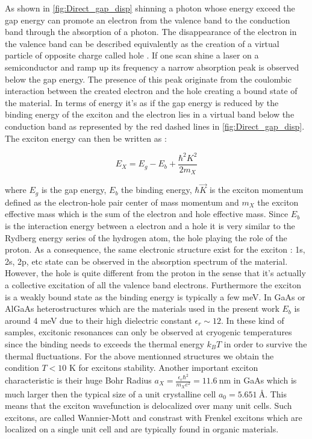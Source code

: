 \label{sub:exciton}

As shown in \autoref{fig:Direct_gap_disp} shinning a photon whose energy exceed the gap energy can promote an electron from the valence band to the conduction band through the absorption of a photon. 
The disappearance of the electron in the valence band can be described equivalently as the creation of a virtual particle of opposite charge called hole \cite{Combescot_cooper_excitons_2015}.
 If one scan shine a laser on a semiconductor and ramp up its frequency a narrow absorption peak is observed below the gap energy.  The presence of this peak originate from the coulombic interaction between the created electron and the hole creating a bound state of the material. In terms of energy it's as if the gap energy is reduced by the binding energy of the exciton and the electron lies in a virtual band below the conduction band as represented by the red dashed lines in \autoref{fig:Direct_gap_disp}.
 The exciton energy can then be written as : 

\begin{equation}
    E_{X} = E_g - E_b + \frac{\hbar^2 K^2}{2m_{X}}
\end{equation}

where $E_g$ is the gap energy, $E_b$ the binding energy,  $\hbar \vec{K}$ is the exciton momentum defined as the electron-hole pair center of mass momentum and $m_{X}$ the exciton effective mass which is the sum of the electron and hole effective mass.
Since $E_b$ is the interaction energy between a electron and a hole it is very similar to the Rydberg energy series of the hydrogen atom, the hole playing the role of the proton. As a consequence, the same electronic structure exist for the exciton : 1s, 2s, 2p, etc state can be observed in the absorption spectrum of the material.
However, the hole is quite different from the proton in the sense that it's actually a collective excitation of all the valence band electrons. Furthermore the exciton is a weakly bound state as the binding energy is typically a few meV. In GaAs or AlGaAs heterostructures which are the materials used in the present work $E_b$ is around 4 meV due to their high dielectric constant $\epsilon_r \sim 12$.
In these kind of samples, excitonic resonances can only be observed at cryogenic temperatures since the binding needs to exceeds the thermal energy $k_B T$ in order to survive the thermal fluctuations. For the above mentionned structures we obtain the condition $T<10$ K for excitons stability.
Another important exciton characteristic is their huge Bohr Radius $a_X= \frac{\epsilon_r \hbar^2}{m_X e^2}= 11.6 \ \mathrm{nm}$ in GaAs which  is much larger then the typical size of a unit crystalline cell $a_0 = 5.65 \SI{1}{\angstrom}$. This means that the exciton wavefunction is delocalized over many unit cells. Such excitons, are called Wannier-Mott and constrast with Frenkel excitons which are localized on a single unit cell and are typically found in organic materials.
 \bigskip\noindent

